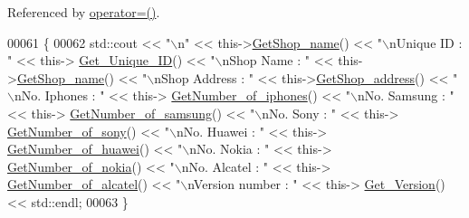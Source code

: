 Referenced by \hyperlink{_c_a_r_p_h_o_n_e___w_a_r_e_h_o_u_s_e_8h_source_l00075}{operator=()}.


\begin{DoxyCode}
00061 \{
00062    std::cout << \textcolor{stringliteral}{"\(\backslash\)n"} <<  this->\hyperlink{class_c_a_r_p_h_o_n_e___w_a_r_e_h_o_u_s_e_a4932d1483f97e12e01be200951c572df_a4932d1483f97e12e01be200951c572df}{GetShop\_name}() << \textcolor{stringliteral}{"\(\backslash\)nUnique ID : "} << this->
      \hyperlink{class_o_s_t_m_a5a01a8b98d16b1d1904ecf9356e7b71d_a5a01a8b98d16b1d1904ecf9356e7b71d}{Get\_Unique\_ID}() << \textcolor{stringliteral}{"\(\backslash\)nShop Name : "}  << this->\hyperlink{class_c_a_r_p_h_o_n_e___w_a_r_e_h_o_u_s_e_a4932d1483f97e12e01be200951c572df_a4932d1483f97e12e01be200951c572df}{GetShop\_name}() << \textcolor{stringliteral}{"\(\backslash\)nShop Address : 
      "} << this->\hyperlink{class_c_a_r_p_h_o_n_e___w_a_r_e_h_o_u_s_e_a90c80d52aa860d00c3fb9c165646637b_a90c80d52aa860d00c3fb9c165646637b}{GetShop\_address}() << \textcolor{stringliteral}{"\(\backslash\)nNo. Iphones : "} << this->
      \hyperlink{class_c_a_r_p_h_o_n_e___w_a_r_e_h_o_u_s_e_a640af469d055cb8836c42ac4ce135e6f_a640af469d055cb8836c42ac4ce135e6f}{GetNumber\_of\_iphones}() << \textcolor{stringliteral}{"\(\backslash\)nNo. Samsung : "} << this->
      \hyperlink{class_c_a_r_p_h_o_n_e___w_a_r_e_h_o_u_s_e_a0cd9d93b5b145846627d3005dff71f6f_a0cd9d93b5b145846627d3005dff71f6f}{GetNumber\_of\_samsung}() << \textcolor{stringliteral}{"\(\backslash\)nNo. Sony : "} << this->
      \hyperlink{class_c_a_r_p_h_o_n_e___w_a_r_e_h_o_u_s_e_a955e5b413e1f41a36dcc12837664f364_a955e5b413e1f41a36dcc12837664f364}{GetNumber\_of\_sony}() << \textcolor{stringliteral}{"\(\backslash\)nNo. Huawei : "} << this->
      \hyperlink{class_c_a_r_p_h_o_n_e___w_a_r_e_h_o_u_s_e_a9200c484f288fce0246008e5d683507f_a9200c484f288fce0246008e5d683507f}{GetNumber\_of\_huawei}() << \textcolor{stringliteral}{"\(\backslash\)nNo. Nokia : "} << this->
      \hyperlink{class_c_a_r_p_h_o_n_e___w_a_r_e_h_o_u_s_e_aac1959dee51204439fc0721403d23447_aac1959dee51204439fc0721403d23447}{GetNumber\_of\_nokia}() << \textcolor{stringliteral}{"\(\backslash\)nNo. Alcatel : "} << this->
      \hyperlink{class_c_a_r_p_h_o_n_e___w_a_r_e_h_o_u_s_e_a8d278005b2ba46869f6787681ad05704_a8d278005b2ba46869f6787681ad05704}{GetNumber\_of\_alcatel}() << \textcolor{stringliteral}{"\(\backslash\)nVersion number : "} << this->
      \hyperlink{class_o_s_t_m_a1f1db9d482f22c8e7caa17dfb340626b_a1f1db9d482f22c8e7caa17dfb340626b}{Get\_Version}() << std::endl;
00063 \}
\end{DoxyCode}


